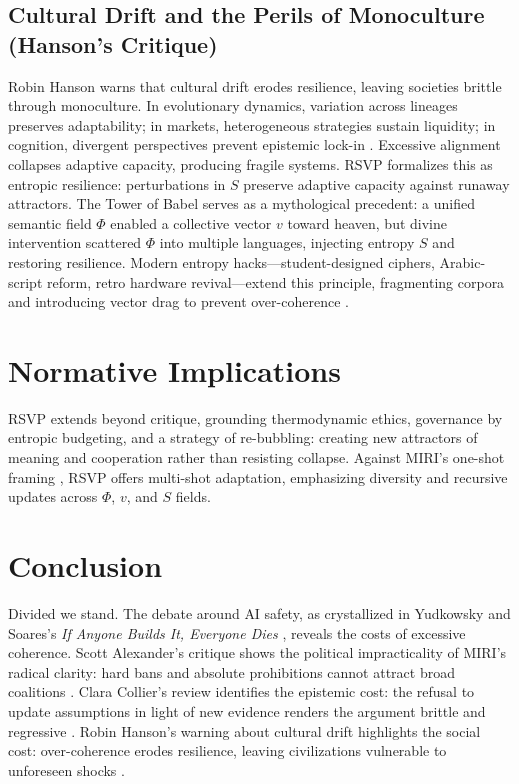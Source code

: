 \documentclass[12pt]{article}
\begin{document}
\subsection{Cultural Drift and the Perils of Monoculture (Hanson’s Critique)}
Robin Hanson \citep{hanson2024culturaldrift} warns that cultural drift erodes resilience, leaving societies brittle through monoculture. In evolutionary dynamics, variation across lineages preserves adaptability; in markets, heterogeneous strategies sustain liquidity; in cognition, divergent perspectives prevent epistemic lock-in \citep{hanson2024culturaldrift}. Excessive alignment collapses adaptive capacity, producing fragile systems. RSVP formalizes this as entropic resilience: perturbations in $S$ preserve adaptive capacity against runaway attractors. The Tower of Babel \citep{genesis11} serves as a mythological precedent: a unified semantic field $\Phi$ enabled a collective vector $v$ toward heaven, but divine intervention scattered $\Phi$ into multiple languages, injecting entropy $S$ and restoring resilience. Modern entropy hacks—student-designed ciphers, Arabic-script reform, retro hardware revival—extend this principle, fragmenting corpora and introducing vector drag to prevent over-coherence \citep{hanson2024culturaldrift}.

\section{Normative Implications}
RSVP extends beyond critique, grounding thermodynamic ethics, governance by entropic budgeting, and a strategy of re-bubbling: creating new attractors of meaning and cooperation rather than resisting collapse. Against MIRI’s one-shot framing \citep{yudkowsky2025IABIED}, RSVP offers multi-shot adaptation, emphasizing diversity and recursive updates across $\Phi$, $v$, and $S$ fields.

\section{Conclusion}
Divided we stand. The debate around AI safety, as crystallized in Yudkowsky and Soares’s \textit{If Anyone Builds It, Everyone Dies} \citep{yudkowsky2025IABIED}, reveals the costs of excessive coherence. Scott Alexander’s critique shows the political impracticality of MIRI’s radical clarity: hard bans and absolute prohibitions cannot attract broad coalitions \citep{alexander2025reviewIABIED}. Clara Collier’s review identifies the epistemic cost: the refusal to update assumptions in light of new evidence renders the argument brittle and regressive \citep{collier2025reviewIABIED}. Robin Hanson’s warning about cultural drift highlights the social cost: over-coherence erodes resilience, leaving civilizations vulnerable to unforeseen shocks \citep{hanson2024culturaldrift}.
\end{document}
